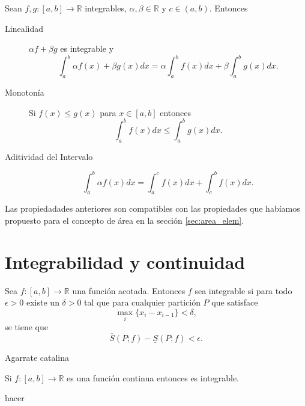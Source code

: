 \begin{teorema} Sean $f,g:[a,b]\to\mathbb{R}$ integrables, $\alpha,\beta\in\mathbb{R}$ y $c\in (a,b)$. Entonces
\begin{description}
 \item[Linealidad] $\alpha f+\beta g$ es integrable y 
 \[
  \int_a^b\alpha f(x)+\beta g(x)dx=\alpha \int_a^bf(x)dx+\beta\int_a^b g(x)dx.
 \]
 \item[Monotonía] Si $f(x)\leq g(x)$  para $x\in [a,b]$ entonces 
 \[
  \int_a^b f(x)dx\leq \int_a^b g(x)dx.
 \]
 \item[Aditividad del Intervalo]  \[
  \int_a^b\alpha f(x)dx= \int_a^cf(x)dx+\int_c^b f(x)dx.
 \]
\end{description}


\end{teorema}

\begin{observa} Las propiedadades anteriores son compatibles con las propiedades que habíamos propuesto para el concepto de área en la sección  \ref{sec:area_elem}.
\end{observa}

\section{Integrabilidad y continuidad}


 
\begin{teorema}  Sea $f:[a,b]\to\mathbb{R}$ una función acotada. Entonces  $f$ sea integrable si para todo $\epsilon>0$ existe un $\delta>0$ tal que para cualquier partición $P$ que satisface
\[\max_i\{x_i-x_{i-1}\}<\delta,\]
se tiene que
\begin{equation}\label{eq:Crit1Int}
 \overline{S}(P;f)-\underline{S}(P;f)<\epsilon.
\end{equation}
 
\end{teorema}
\begin{demo} Agarrate catalina
 
\end{demo}

\begin{teorema}  Si $f:[a,b]\to\mathbb{R}$ es una función continua entonces es integrable.
\end{teorema}
\begin{demo} hacer
 \end{demo}

